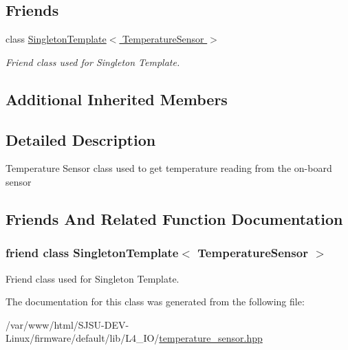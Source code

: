 \subsection*{Friends}
\begin{DoxyCompactItemize}
\item 
class \hyperlink{classTemperatureSensor_a174bb3cf04f344b31471319bf946c47d}{Singleton\+Template$<$ Temperature\+Sensor $>$}
\begin{DoxyCompactList}\small\item\em Friend class used for Singleton Template. \end{DoxyCompactList}\end{DoxyCompactItemize}
\subsection*{Additional Inherited Members}


\subsection{Detailed Description}
Temperature Sensor class used to get temperature reading from the on-\/board sensor 

\subsection{Friends And Related Function Documentation}
\subsubsection[{\texorpdfstring{Singleton\+Template$<$ Temperature\+Sensor $>$}{SingletonTemplate< TemperatureSensor >}}]{\setlength{\rightskip}{0pt plus 5cm}friend class {\bf Singleton\+Template}$<$ {\bf Temperature\+Sensor} $>$\hspace{0.3cm}{\ttfamily [friend]}}\hypertarget{classTemperatureSensor_a174bb3cf04f344b31471319bf946c47d}{}\label{classTemperatureSensor_a174bb3cf04f344b31471319bf946c47d}


Friend class used for Singleton Template. 



The documentation for this class was generated from the following file\+:\begin{DoxyCompactItemize}
\item 
/var/www/html/\+S\+J\+S\+U-\/\+D\+E\+V-\/\+Linux/firmware/default/lib/\+L4\+\_\+\+I\+O/\hyperlink{temperature__sensor_8hpp}{temperature\+\_\+sensor.\+hpp}\end{DoxyCompactItemize}
